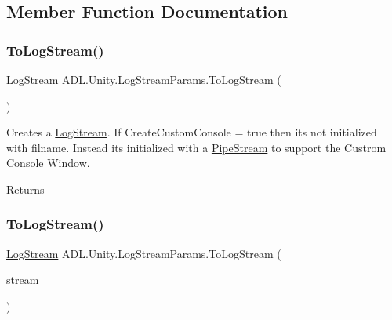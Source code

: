 \subsection{Member Function Documentation}
\mbox{\label{class_a_d_l_1_1_unity_1_1_log_stream_params_a511976146d776a6e618baf1e47c99f34}} 
\subsubsection{\texorpdfstring{To\+Log\+Stream()}{ToLogStream()}\hspace{0.1cm}{\footnotesize\ttfamily [1/2]}}
{\footnotesize\ttfamily \mbox{\hyperlink{class_a_d_l_1_1_log_stream}{Log\+Stream}} A\+D\+L.\+Unity.\+Log\+Stream\+Params.\+To\+Log\+Stream (\begin{DoxyParamCaption}{ }\end{DoxyParamCaption})}



Creates a \mbox{\hyperlink{class_a_d_l_1_1_log_stream}{Log\+Stream}}. If Create\+Custom\+Console = true then its not initialized with filname. Instead its initialized with a \mbox{\hyperlink{class_a_d_l_1_1_pipe_stream}{Pipe\+Stream}} to support the Custrom Console Window. 

\begin{DoxyReturn}{Returns}

\end{DoxyReturn}
\mbox{\label{class_a_d_l_1_1_unity_1_1_log_stream_params_a8cd3548465c20596918ee37292bed704}} 
\subsubsection{\texorpdfstring{To\+Log\+Stream()}{ToLogStream()}\hspace{0.1cm}{\footnotesize\ttfamily [2/2]}}
{\footnotesize\ttfamily \mbox{\hyperlink{class_a_d_l_1_1_log_stream}{Log\+Stream}} A\+D\+L.\+Unity.\+Log\+Stream\+Params.\+To\+Log\+Stream (\begin{DoxyParamCaption}\item[{System.\+I\+O.\+Stream}]{stream }\end{DoxyParamCaption})}



